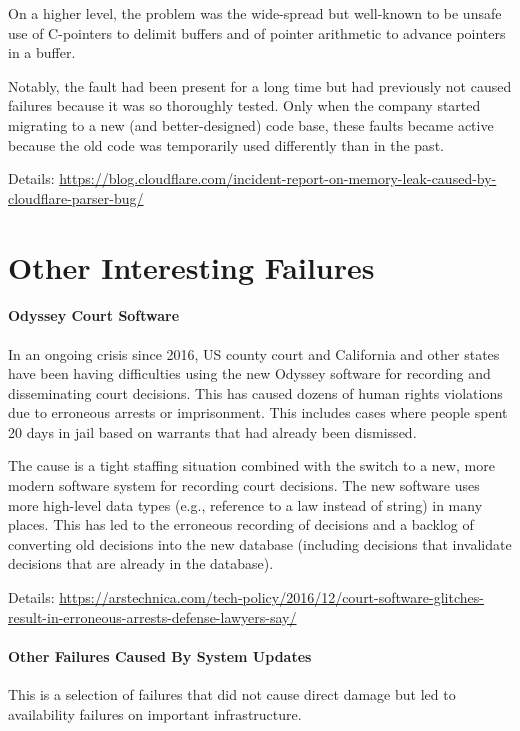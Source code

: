 On a higher level, the problem was the wide-spread but well-known to be unsafe use of C-pointers to delimit buffers and of pointer arithmetic to advance pointers in a buffer.

Notably, the fault had been present for a long time but had previously not caused failures because it was so thoroughly tested.
Only when the company started migrating to a new (and better-designed) code base, these faults became active because the old code was temporarily used differently than in the past.

Details: \url{https://blog.cloudflare.com/incident-report-on-memory-leak-caused-by-cloudflare-parser-bug/}


\section{Other Interesting Failures}

\paragraph{Odyssey Court Software}
In an ongoing crisis since 2016, US county court and California and other states have been having difficulties using the new Odyssey software for recording and disseminating court decisions.
This has caused dozens of human rights violations due to erroneous arrests or imprisonment.
This includes cases where people spent 20 days in jail based on warrants that had already been dismissed.

The cause is a tight staffing situation combined with the switch to a new, more modern software system for recording court decisions.
The new software uses more high-level data types (e.g., reference to a law instead of string) in many places.
This has led to the erroneous recording of decisions and a backlog of converting old decisions into the new database (including decisions that invalidate decisions that are already in the database).

Details: \url{https://arstechnica.com/tech-policy/2016/12/court-software-glitches-result-in-erroneous-arrests-defense-lawyers-say/}

\paragraph{Other Failures Caused By System Updates}
This is a selection of failures that did not cause direct damage but led to availability failures on important infrastructure.

